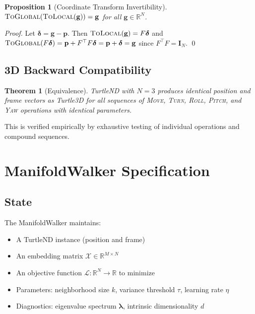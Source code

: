 \documentclass[11pt,letterpaper]{article}
\newtheorem{theorem}{Theorem}[section]
\newtheorem{proposition}{Proposition}[section]
\newcommand{\R}{\mathbb{R}}
\newcommand{\pos}{\mathbf{p}}
\newcommand{\obj}{\mathcal{L}}
\newcommand{\eye}{\mathbf{I}}
\begin{document}
\begin{proposition}[Coordinate Transform Invertibility]
\label{prop:coords}
$\textsc{ToGlobal}(\textsc{ToLocal}(\mathbf{g})) = \mathbf{g}$ for all $\mathbf{g} \in \R^N$.
\end{proposition}

\begin{proof}
Let $\bm{\delta} = \mathbf{g} - \pos$. Then $\textsc{ToLocal}(\mathbf{g}) = F\bm{\delta}$
and $\textsc{ToGlobal}(F\bm{\delta}) = \pos + F^\top F \bm{\delta} = \pos + \bm{\delta} = \mathbf{g}$
since $F^\top F = \eye_N$. \qed
\end{proof}

\subsection{3D Backward Compatibility}

\begin{theorem}[Equivalence]
\label{thm:compat}
TurtleND with $N=3$ produces identical position and frame vectors as
Turtle3D for all sequences of \textsc{Move}, \textsc{Turn}, \textsc{Roll},
\textsc{Pitch}, and \textsc{Yaw} operations with identical parameters.
\end{theorem}

This is verified empirically by exhaustive testing of individual operations
and compound sequences.

\section{ManifoldWalker Specification}
\label{sec:walker}

\subsection{State}

The ManifoldWalker maintains:
\begin{itemize}[nosep]
  \item A TurtleND instance (position and frame)
  \item An embedding matrix $\mathcal{X} \in \R^{M \times N}$
  \item An objective function $\obj : \R^N \to \R$ to minimize
  \item Parameters: neighborhood size $k$, variance threshold $\tau$, learning rate $\eta$
  \item Diagnostics: eigenvalue spectrum $\bm{\lambda}$, intrinsic dimensionality $d$
\end{itemize}
\end{document}
